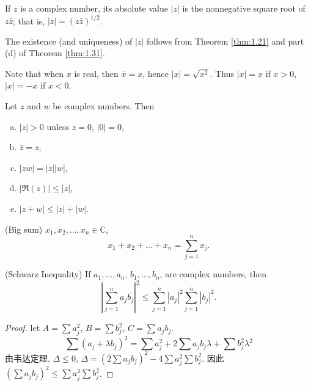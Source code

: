 \begin{mydef}
    \label{def:1.32}
    If $z$ is a complex number, 
    its absolute value $|z|$ is the nonnegative square root of $z\bar{z}$; 
    that is, $|z| = (z\bar{z})^{1/2}$.
\end{mydef}
The existence (and uniqueness) of $|z|$ follows from Theorem \ref{thm:1.21} and part (d) of Theorem \ref{thm:1.31}.

Note that when $x$ is real, then $\bar{x} = x$, 
hence $|x| = \sqrt{x^2}$. Thus $|x| = x$
if $x>0$, $|x| = -x$ if $x <0$.

\begin{thm}
    \label{thm:1.33}
    Let $z$ and $w$ be complex numbers. Then
    \begin{enumerate}[(a)]
        \item $|z|>0$ unless $z=0$, $|0|=0$,
        \item $\bar{z}=z$,
        \item $|zw| = |z||w|$,
        \item $| \Re(z)| \leq |z|$,
        \item $|z+w| \leq|z|+|w|$.
    \end{enumerate}
\end{thm}


\begin{myNotation}(Big sum)
    \label{myNotation:1.34}
    $x_1,x_2,\dots,x_n \in \mathbb{C}$,
    \begin{equation*}
        x_1+x_2+\dots+x_n = \sum_{j=1}^{n} x_j.
    \end{equation*}
\end{myNotation}

\begin{thm}(Schwarz Inequality)
    \label{thm:1.35}
    If 
    $a_1,\dots,a_n$, 
    $b_1,\dots,b_n$, are complex numbers, then
    \begin{equation*}
        \left| \sum_{j=1}^{n}a_j \bar{b_j}\right|^2 \leq 
        \sum_{j=1}^{n}\left|a_j\right|^2
        \sum_{j=1}^{n}\left|b_j\right|^2.
    \end{equation*}    
\end{thm}

\begin{proof}
    let $A = \sum a_j^2$, $B = \sum b_j^2$, $C = \sum a_j b_j$.
    \begin{equation*}
        \sum (a_j+\lambda b_j)^2 = 
        \sum a_j^2 
        + 2\sum a_j b_j \lambda
        + \sum b_j^2 \lambda^2
    \end{equation*}
    由韦达定理, $\Delta \leq 0$, 
    $\Delta= (2\sum a_j b_j )^2 - 4 \sum a_j^2\sum b_j^2$. 
    因此 $(\sum a_j b_j )^2 \leq \sum a_j^2\sum b_j^2$.
\end{proof}


